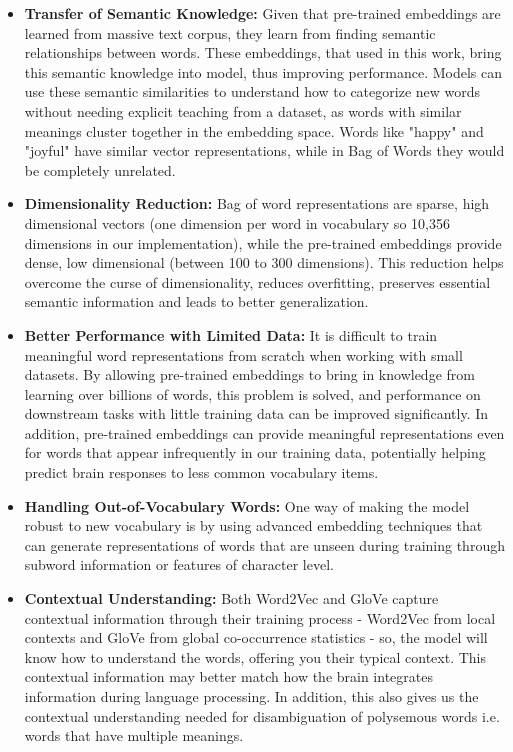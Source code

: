 \documentclass[12pt,letterpaper]{article}
\begin{document}
\begin{itemize}[itemsep=0.2cm]
    \item \textbf{Transfer of Semantic Knowledge:} Given that pre-trained embeddings are learned from massive text corpus, they learn from finding semantic relationships between words. These embeddings, that used in this work, bring this semantic knowledge into model, thus improving performance. Models can use these semantic similarities to understand how to categorize new words without needing explicit teaching from a dataset, as words with similar meanings cluster together in the embedding space. Words like "happy" and "joyful" have similar vector representations, while in Bag of Words they would be completely unrelated.
    
    
    \item \textbf{Dimensionality Reduction:} Bag of word representations are sparse, high dimensional vectors (one dimension per word in vocabulary so 10,356 dimensions in our implementation), while the pre-trained embeddings provide dense, low dimensional (between 100 to 300 dimensions). This reduction helps overcome the curse of dimensionality, reduces overfitting, preserves essential semantic information and leads to better generalization.
    
    \item \textbf{Better Performance with Limited Data:} It is difficult to train meaningful word representations from scratch when working with small datasets. By allowing pre-trained embeddings to bring in knowledge from learning over billions of words, this problem is solved, and performance on downstream tasks with little training data can be improved significantly. In addition, pre-trained embeddings can provide meaningful representations even for words that appear infrequently in our training data, potentially helping predict brain responses to less common vocabulary items.

    \item \textbf{Handling Out-of-Vocabulary Words:}  One way of making the model robust to new vocabulary is by using advanced embedding techniques that can generate representations of words that are unseen during training through subword information or features of character level.
    
    \item \textbf{Contextual Understanding:} Both Word2Vec and GloVe capture contextual information through their training process - Word2Vec from local contexts and GloVe from global co-occurrence statistics - so, the model will know how to understand the words, offering you their typical context. This contextual information may better match how the brain integrates information during language processing. In addition, this also gives us the contextual understanding needed for disambiguation of polysemous words i.e. words that have multiple meanings.
    

\end{itemize}
\end{document}
